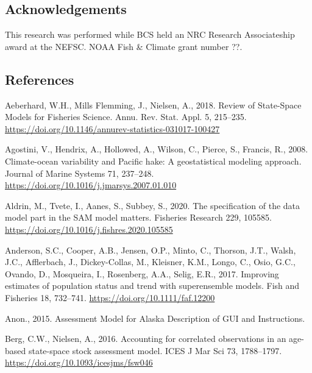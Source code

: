 \documentclass[]{article}
\begin{document}
\hypertarget{acknowledgements}{%
\subsection*{Acknowledgements}\label{acknowledgements}}

This research was performed while BCS held an NRC Research Associateship
award at the NEFSC. NOAA Fish \& Climate grant number ??.

\pagebreak

\hypertarget{references}{%
\subsection*{References}\label{references}}

\hypertarget{refs}{}
\leavevmode\hypertarget{ref-aeberhard2018Review}{}%
Aeberhard, W.H., Mills Flemming, J., Nielsen, A., 2018. Review of
State-Space Models for Fisheries Science. Annu. Rev. Stat. Appl. 5,
215--235. \url{https://doi.org/10.1146/annurev-statistics-031017-100427}

\leavevmode\hypertarget{ref-agostini2008Climateocean}{}%
Agostini, V., Hendrix, A., Hollowed, A., Wilson, C., Pierce, S.,
Francis, R., 2008. Climate-ocean variability and Pacific hake: A
geostatistical modeling approach. Journal of Marine Systems 71,
237--248. \url{https://doi.org/10.1016/j.jmarsys.2007.01.010}

\leavevmode\hypertarget{ref-aldrin2020Specification}{}%
Aldrin, M., Tvete, I., Aanes, S., Subbey, S., 2020. The specification of
the data model part in the SAM model matters. Fisheries Research 229,
105585. \url{https://doi.org/10.1016/j.fishres.2020.105585}

\leavevmode\hypertarget{ref-anderson2017Improving}{}%
Anderson, S.C., Cooper, A.B., Jensen, O.P., Minto, C., Thorson, J.T.,
Walsh, J.C., Afflerbach, J., Dickey-Collas, M., Kleisner, K.M., Longo,
C., Osio, G.C., Ovando, D., Mosqueira, I., Rosenberg, A.A., Selig, E.R.,
2017. Improving estimates of population status and trend with
superensemble models. Fish and Fisheries 18, 732--741.
\url{https://doi.org/10.1111/faf.12200}

\leavevmode\hypertarget{ref-anon2015AMAK}{}%
Anon., 2015. Assessment Model for Alaska Description of GUI and
Instructions.

\leavevmode\hypertarget{ref-berg2016Accounting}{}%
Berg, C.W., Nielsen, A., 2016. Accounting for correlated observations in
an age-based state-space stock assessment model. ICES J Mar Sci 73,
1788--1797. \url{https://doi.org/10.1093/icesjms/fsw046}
\end{document}
